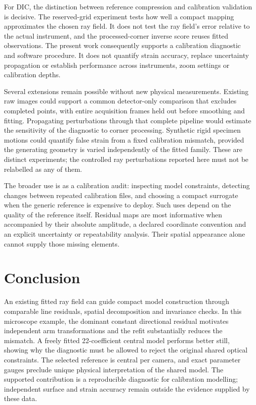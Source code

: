 \documentclass[10pt,a4paper]{article}
\begin{document}
For DIC, the distinction between reference compression and calibration validation is decisive. The reserved-grid experiment tests how well a compact mapping approximates the chosen ray field. It does not test the ray field's error relative to the actual instrument, and the processed-corner inverse score reuses fitted observations. The present work consequently supports a calibration diagnostic and software procedure. It does not quantify strain accuracy, replace uncertainty propagation or establish performance across instruments, zoom settings or calibration depths.

Several extensions remain possible without new physical measurements. Existing raw images could support a common detector-only comparison that excludes completed points, with entire acquisition frames held out before smoothing and fitting. Propagating perturbations through that complete pipeline would estimate the sensitivity of the diagnostic to corner processing. Synthetic rigid specimen motions could quantify false strain from a fixed calibration mismatch, provided the generating geometry is varied independently of the fitted family. These are distinct experiments; the controlled ray perturbations reported here must not be relabelled as any of them.

The broader use is as a calibration audit: inspecting model constraints, detecting changes between repeated calibration files, and choosing a compact surrogate when the generic reference is expensive to deploy. Such uses depend on the quality of the reference itself. Residual maps are most informative when accompanied by their absolute amplitude, a declared coordinate convention and an explicit uncertainty or repeatability analysis. Their spatial appearance alone cannot supply those missing elements.

\section{Conclusion}
An existing fitted ray field can guide compact model construction through comparable line residuals, spatial decomposition and invariance checks. In this microscope example, the dominant constant directional residual motivates independent arm transformations and the refit substantially reduces the mismatch. A freely fitted 22-coefficient central model performs better still, showing why the diagnostic must be allowed to reject the original shared optical constraints. The selected reference is central per camera, and exact parameter gauges preclude unique physical interpretation of the shared model. The supported contribution is a reproducible diagnostic for calibration modelling; independent surface and strain accuracy remain outside the evidence supplied by these data.
\end{document}
